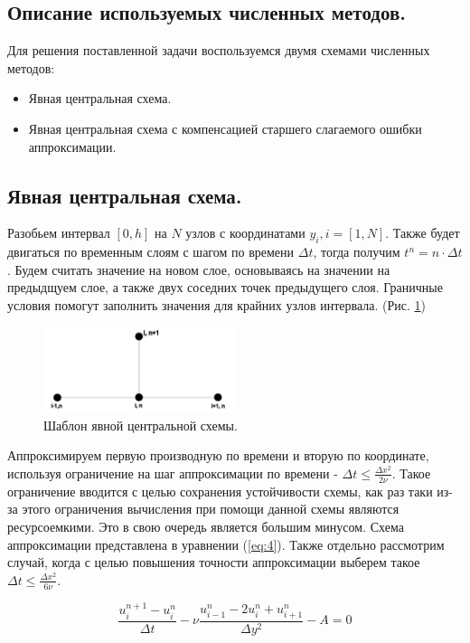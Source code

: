 \subsection{Описание используемых численных методов.}

Для решения поставленной задачи воспользуемся двумя схемами численных методов:
\begin{itemize}
    \item Явная центральная схема.
    \item Явная центральная схема с компенсацией старшего слагаемого ошибки аппроксимации.
\end{itemize}

\subsection{Явная центральная схема.}
Разобьем интервал $[0,h]$ на $N$ узлов с координатами $y_i, i=[1,N]$. Также будет двигаться по временным слоям с шагом по времени $\Delta t$, тогда получим $t^n = n \cdot \Delta t$. 
Будем считать значение на новом слое, основываясь на значении на предыдщуем слое, а также двух соседних точек предыдущего слоя. Граничные условия помогут заполнить значения для крайних узлов интервала. (Рис. \ref{fig:2})
\begin{figure}[H]
    \centering
    \includegraphics[width=0.5\textwidth]{images/2.png}
    \caption {Шаблон явной центральной схемы.}
    \label{fig:2}
\end{figure}

Аппроксимируем первую производную по времени и вторую по координате, используя ограничение на шаг аппроксимации по времени - $\Delta t \leq \frac{\Delta x^2}{2\nu}$. 
Такое ограничение вводится с целью сохранения устойчивости схемы, как раз таки из-за этого ограничения вычисления при помощи данной схемы являются ресурсоемкими. Это в свою очередь является большим минусом.
Схема аппроксимации представлена в уравнении (\ref{eq:4}).
Также отдельно рассмотрим случай, когда с целью повышения точности аппроксимации выберем такое $\Delta t \leq \frac{\Delta x^2}{6\nu}$.

\begin{equation}
    \frac{u^{n+1}_i-u^n_i}{\Delta t} - \nu \frac{u^n_{i-1}-2u^n_i+u^n_{i+1}}{\Delta y^2} - A =0
    \label{eq:4}
\end{equation}

